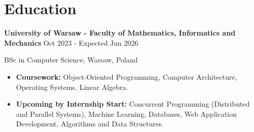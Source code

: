 \renewcommand{\subsection}[3]{
    \noindent\textbf{#1}  \emph{#2} \hfill #3 \break
}

\section{Education}
\subsection{University of Warsaw - Faculty of Mathematics, Informatics and Mechanics}{}{Oct 2023 - Expected Jun 2026}
BSc in Computer Science, Warsaw, Poland \hfill

\begin{itemize}
    \item \textbf{Coursework:} Object-Oriented Programming, Computer Architecture, Operating Systems, Linear Algebra.
    \item \textbf{Upcoming by Internship Start:} Concurrent Programming (Distributed and Parallel Systems), Machine Learning, Databases, Web Application Development, Algorithms and Data Structures.
\end{itemize}

\vspace{1em}
